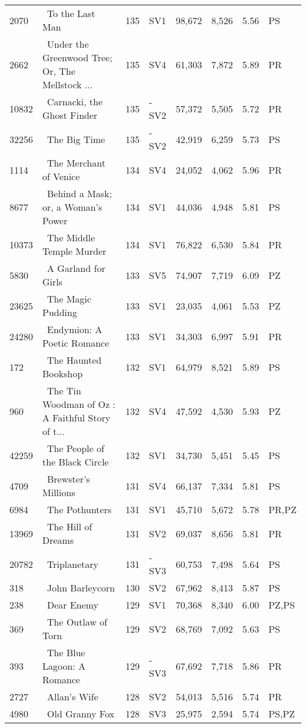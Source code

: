 \begin{longtable}{l | l | l | l | l | l | l | l}
2070 & ~To the Last Man & 135 & SV1 & 98,672 & 8,526 & 5.56 & PS\\
2662 & ~Under the Greenwood Tree; Or, The Mellstock ... & 135 & SV4 & 61,303 & 7,872 & 5.89 & PR\\
10832 & ~Carnacki, the Ghost Finder & 135 & -SV2 & 57,372 & 5,505 & 5.72 & PR\\
32256 & ~The Big Time & 135 & -SV2 & 42,919 & 6,259 & 5.73 & PS\\
1114 & ~The Merchant of Venice & 134 & SV4 & 24,052 & 4,062 & 5.96 & PR\\
8677 & ~Behind a Mask; or, a Woman's Power & 134 & SV1 & 44,036 & 4,948 & 5.81 & PS\\
10373 & ~The Middle Temple Murder & 134 & SV1 & 76,822 & 6,530 & 5.84 & PR\\
5830 & ~A Garland for Girls & 133 & SV5 & 74,907 & 7,719 & 6.09 & PZ\\
23625 & ~The Magic Pudding & 133 & SV1 & 23,035 & 4,061 & 5.53 & PZ\\
24280 & ~Endymion: A Poetic Romance & 133 & SV1 & 34,303 & 6,997 & 5.91 & PR\\
172 & ~The Haunted Bookshop & 132 & SV1 & 64,979 & 8,521 & 5.89 & PS\\
960 & ~The Tin Woodman of Oz
: A Faithful Story of t... & 132 & SV4 & 47,592 & 4,530 & 5.93 & PZ\\
42259 & ~The People of the Black Circle & 132 & SV1 & 34,730 & 5,451 & 5.45 & PS\\
4709 & ~Brewster's Millions & 131 & SV4 & 66,137 & 7,334 & 5.81 & PS\\
6984 & ~The Pothunters & 131 & SV1 & 45,710 & 5,672 & 5.78 & PR,PZ\\
13969 & ~The Hill of Dreams & 131 & SV2 & 69,037 & 8,656 & 5.81 & PR\\
20782 & ~Triplanetary & 131 & -SV3 & 60,753 & 7,498 & 5.64 & PS\\
318 & ~John Barleycorn & 130 & SV2 & 67,962 & 8,413 & 5.87 & PS\\
238 & ~Dear Enemy & 129 & SV1 & 70,368 & 8,340 & 6.00 & PZ,PS\\
369 & ~The Outlaw of Torn & 129 & SV2 & 68,769 & 7,092 & 5.63 & PS\\
393 & ~The Blue Lagoon: A Romance & 129 & -SV3 & 67,692 & 7,718 & 5.86 & PR\\
2727 & ~Allan's Wife & 128 & SV2 & 54,013 & 5,516 & 5.74 & PR\\
4980 & ~Old Granny Fox & 128 & SV3 & 25,975 & 2,594 & 5.74 & PS,PZ\\

\end{longtable}

